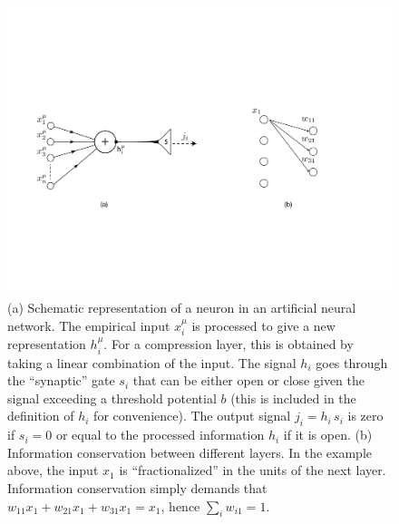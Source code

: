 \documentclass[5p]{elsarticle}
\begin{document}
\begin{figure}[t!]
 \centering
  	\includegraphics[width = .8\textwidth]{fig1.pdf}
  	\caption{(a) Schematic representation of a neuron in an artificial neural network. The empirical input $x^{\mu}_i$ is processed to give a new representation $h^{\mu}_i$. For a compression layer, this is obtained by taking a linear combination of the input. The signal $h_i$ goes through the ``synaptic'' gate $s_i$ that can be either open or close given the signal exceeding a threshold potential $b$ (this is included in the definition of $h_i$ for convenience). The output signal $j_i = h_i \, s_i$ is zero if $s_i=0$ or equal to the processed information $h_i$ if it is open. (b) Information conservation between different layers.  In the example above, the input $x_1$ is ``fractionalized'' in the units of the next layer. Information conservation simply demands that $w_{11} x_1 + w_{21} x_1 + w_{31} x_1 = x_1$, hence $\sum_i w_{i1}=1$. }
	\label{fig:synapse}
\end{figure}
\end{document}
